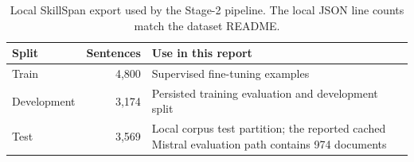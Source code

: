 \begin{table}[H]
\centering
\caption{Local SkillSpan export used by the Stage-2 pipeline. The local JSON line counts match the dataset README.}
\label{tab:dataset-splits}
\begin{tabular}{lrp{}}
\toprule
Split & Sentences & Use in this report \\
\midrule
Train & 4,800 & Supervised fine-tuning examples \\
Development & 3,174 & Persisted training evaluation and development split \\
Test & 3,569 & Local corpus test partition; the reported cached Mistral evaluation path contains 974 documents \\
\bottomrule
\end{tabular}
\end{table}
